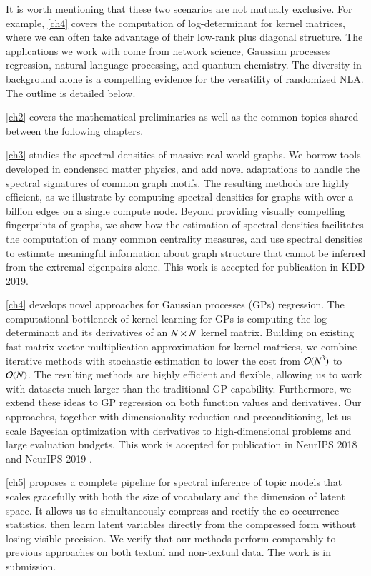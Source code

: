 It is worth mentioning that these two scenarios are not mutually exclusive. For
example, \cref{ch4} covers the computation of log\hyp{}determinant for kernel
matrices, where we can often take advantage of their low\hyp{}rank plus diagonal
structure. The applications we work with come from network science, Gaussian
processes regression, natural language processing, and quantum chemistry. The
diversity in background alone is a compelling evidence for the versatility of
randomized NLA. The outline is detailed below.

\cref{ch2} covers the mathematical preliminaries as well as the common topics
shared between the following chapters.

\cref{ch3} studies the spectral densities of massive real-world graphs. We
borrow tools developed in condensed matter physics, and add novel adaptations to
handle the spectral signatures of common graph motifs.  The resulting methods
are highly efficient, as we illustrate by computing spectral densities for
graphs with over a billion edges on a single compute node. Beyond providing
visually compelling fingerprints of graphs, we show how the  estimation of
spectral densities facilitates the computation of many common centrality
measures, and use spectral densities to estimate meaningful information about
graph structure that cannot be inferred from the extremal eigenpairs alone. This
work is accepted for publication in KDD 2019\cite{dong2019network}.

\cref{ch4} develops novel approaches for Gaussian processes (GPs) regression.
The computational bottleneck of kernel learning for GPs is computing the log
determinant and its derivatives of an $N\mathbin{\times} N$ kernel matrix. Building on
existing fast matrix-vector-multiplication approximation for kernel
matrices, we combine iterative methods with stochastic estimation to
lower the cost from $\mathcal{O}(N^3)$ to $\mathcal{O}(N)$. The resulting methods are highly
efficient and flexible, allowing us to work with datasets much larger than
the traditional GP capability. Furthermore, we extend these ideas to GP
regression on both function values and derivatives. Our approaches, together
with dimensionality reduction and preconditioning, let us scale Bayesian
optimization with derivatives to high\hyp{}dimensional problems and large
evaluation budgets. This work is accepted for publication in NeurIPS 2018
\cite{dong2017scalable} and NeurIPS 2019 \cite{eriksson2018scaling}.

\cref{ch5} proposes a complete pipeline for spectral inference of topic
models that scales gracefully with both the size of vocabulary and the dimension
of latent space. It allows us to simultaneously compress and rectify the 
co\hyp{}occurrence statistics, then learn latent variables directly from the
compressed form without losing visible precision. We verify that our
methods perform comparably to previous approaches on both textual and
non\hyp{}textual data. The work is in submission.

